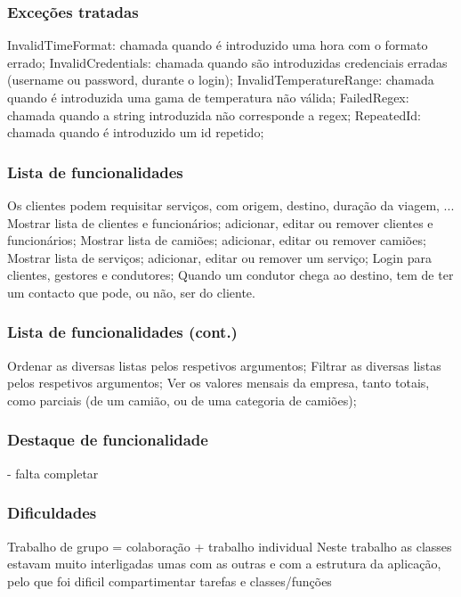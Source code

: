 \documentclass{beamer}
\def\\{}
\begin{document}
\begin{frame}
\frametitle{Exceções tratadas}
InvalidTimeFormat: chamada quando é introduzido uma hora com o formato errado;\\
InvalidCredentials: chamada quando são introduzidas credenciais erradas (username ou password, durante o login);\\
InvalidTemperatureRange: chamada quando é introduzida uma gama de temperatura não válida;\\
FailedRegex: chamada quando a string introduzida não corresponde a regex;\\
RepeatedId: chamada quando é introduzido um id repetido;\\
\end{frame}

\begin{frame}
\frametitle{Lista de funcionalidades} 
Os clientes podem requisitar serviços, com origem, destino, duração da viagem, ...\\
Mostrar lista de clientes e funcionários; adicionar, editar ou remover clientes e funcionários;\\
Mostrar lista de camiões; adicionar, editar ou remover camiões; \\
Mostrar lista de serviços; adicionar, editar ou remover um serviço;\\
Login para clientes, gestores e condutores;\\
Quando um condutor chega ao destino, tem de ter um contacto que pode, ou não, ser do cliente.\\

\end{frame}

\begin{frame}
\frametitle{Lista de funcionalidades (cont.)} 
Ordenar as diversas listas pelos respetivos argumentos;\\
Filtrar as diversas listas pelos respetivos argumentos;\\
Ver os valores mensais da empresa, tanto totais, como parciais (de um camião, ou de uma categoria de camiões);
\end{frame}

\begin{frame}
\frametitle{Destaque de funcionalidade}
 - falta completar

\end{frame}

\begin{frame}
\frametitle{Dificuldades}
Trabalho de grupo = colaboração + trabalho individual\\
Neste trabalho as classes estavam muito interligadas umas com as outras e com a estrutura da aplicação, pelo que foi dificil compartimentar tarefas e classes/funções
\end{frame}
\end{document}
